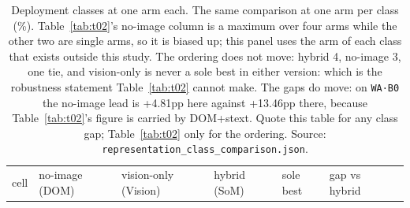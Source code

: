 \begin{table}[tp]
\centering
\caption{Deployment classes at one arm each. The same comparison at one arm per class (\%). Table~\ref{tab:t02}'s no-image column is a maximum over four arms while the other two are single arms, so it is biased up; this panel uses the arm of each class that exists outside this study. The ordering does not move: hybrid 4, no-image 3, one tie, and vision-only is never a sole best in either version: which is the robustness statement Table~\ref{tab:t02} cannot make. The gaps do move: on \texttt{WA·B0} the no-image lead is +4.81pp here against +13.46pp there, because Table~\ref{tab:t02}'s figure is carried by DOM+stext. Quote this table for any class gap; Table~\ref{tab:t02} only for the ordering. Source: \texttt{representation\_class\_comparison.json}.}
\label{tab:t03}
\footnotesize
\setlength{\tabcolsep}{3pt}
\begin{tabular}{@{}
  >{\raggedright\arraybackslash}p{}
  >{\raggedright\arraybackslash}p{}
  >{\raggedright\arraybackslash}p{}
  >{\raggedright\arraybackslash}p{}
  >{\raggedright\arraybackslash}p{}
  >{\raggedright\arraybackslash}p{}
  >{\raggedright\arraybackslash}p{}@{}}
\toprule
\begin{minipage}[b]{\linewidth}\raggedright
cell
\end{minipage} & \begin{minipage}[b]{\linewidth}\raggedright
no-image (DOM)
\end{minipage} & \begin{minipage}[b]{\linewidth}\raggedright
vision-only (Vision)
\end{minipage} & \begin{minipage}[b]{\linewidth}\raggedright
hybrid (SoM)
\end{minipage} & \begin{minipage}[b]{\linewidth}\raggedright
sole best
\end{minipage} & \begin{minipage}[b]{\linewidth}\raggedright
gap vs hybrid
\end{minipage} & \begin{minipage}[b]{\linewidth}\raggedright

\end{minipage}
\end{tabular}
\end{table}
